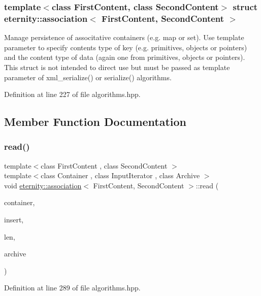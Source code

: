 \subsubsection*{template$<$class First\+Content, class Second\+Content$>$\newline
struct eternity\+::association$<$ First\+Content, Second\+Content $>$}

Manage persistence of associtative containers (e.\+g. map or set). Use template parameter to specify contents type of key (e.\+g. primitives, objects or pointers) and the content type of data (again one from primitives, objects or pointers). This struct is not intended to direct use but must be passed as template parameter of xml\+\_\+serialize() or serialize() algorithms. 

Definition at line 227 of file algorithms.\+hpp.



\subsection{Member Function Documentation}
\mbox{\label{structeternity_1_1association_ab488701a51e5c139347c7c5acc88d05e}} 
\subsubsection{\texorpdfstring{read()}{read()}}
{\footnotesize\ttfamily template$<$class First\+Content , class Second\+Content $>$ \\
template$<$class Container , class Input\+Iterator , class Archive $>$ \\
void \hyperlink{structeternity_1_1association}{eternity\+::association}$<$ First\+Content, Second\+Content $>$\+::read (\begin{DoxyParamCaption}\item[{Container \&}]{container,  }\item[{Input\+Iterator}]{insert,  }\item[{size\+\_\+t}]{len,  }\item[{Archive \&}]{archive }\end{DoxyParamCaption})}



Definition at line 289 of file algorithms.\+hpp.

